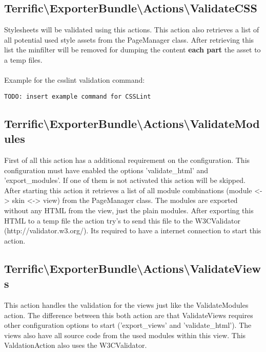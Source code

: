 \subsection{Terrific\textnormal{\textbackslash}ExporterBundle\textnormal{\textbackslash}Actions\textnormal{\textbackslash}ValidateCSS}
Stylesheets will be validated using this actions. This action also retrieves a list of all potential used style assets from the PageManager class. After retrieving this list the minfilter will be removed for dumping the content \textbf{each part} the asset to a temp files.\\
\\
Example for the csslint validation command:
\begin{verbatim}
TODO: insert example command for CSSLint
\end{verbatim}

\subsection{Terrific\textnormal{\textbackslash}ExporterBundle\textnormal{\textbackslash}Actions\textnormal{\textbackslash}ValidateModules}
First of all this action has a additional requirement on the configuration. This configuration must have enabled the options 'validate\_html' and 'export\_modules'. If one of them is not activated this action will be skipped. After starting this action it retrieves a list of all module combinations (module <-> skin <-> view) from the PageManager class. The modules are exported without any HTML from the view, just the plain modules. After exporting this HTML to a temp file the action try's to send this file to the W3CValidator (http://validator.w3.org/). Its required to have a internet connection to start this action.

\subsection{Terrific\textnormal{\textbackslash}ExporterBundle\textnormal{\textbackslash}Actions\textnormal{\textbackslash}ValidateViews}
This action handles the validation for the views just like the ValidateModules action. The difference between this both action are that ValidateViews requires other configuration options to start ('export\_views' and 'validate\_html'). The views also have all source code from the used modules within this view. This ValdationAction also uses the W3CValidator.

